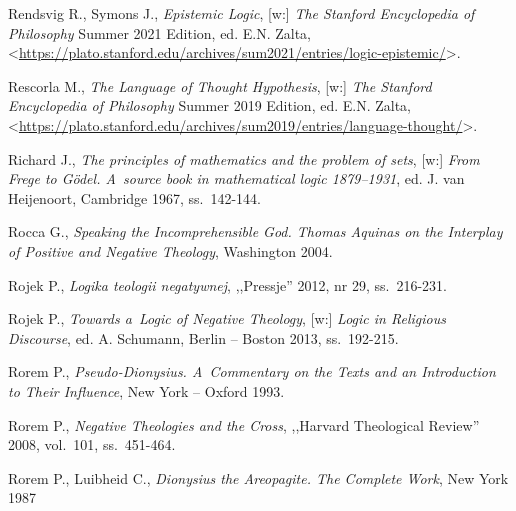 \begin{thebibliography}{100}



Rendsvig R., Symons J., \textit{Epistemic Logic}, [w:] \textit{The Stanford Encyclopedia of Philosophy}
Summer 2021 Edition, ed. E.N. Zalta, <\url{https://plato.stanford.edu/archives/sum2021/entries/logic-epistemic/}>.

Rescorla M., \textit{The Language of Thought Hypothesis}, [w:] \textit{The Stanford Encyclopedia of Philosophy}
Summer 2019 Edition, ed. E.N. Zalta, <\url{https://plato.stanford.edu/archives/sum2019/entries/language-thought/}>.

Richard J., \textit{The principles of mathematics and the problem of sets},
[w:] \textit{From Frege to Gödel. A~source book in mathematical logic 1879–1931}, ed. J. van Heijenoort, Cambridge 1967, ss.~142-144.

Rocca G., \textit{Speaking the Incomprehensible God. Thomas Aquinas on the Interplay of Positive and Negative Theology}, Washington 2004.

Rojek P., \textit{Logika teologii negatywnej}, ,,Pressje'' 2012, nr 29, ss.~216-231.


Rojek P., \textit{Towards a~Logic of Negative Theology}, [w:] \textit{Logic in Religious Discourse}, ed. A. Schumann, Berlin -- Boston 2013, ss.~192-215.

Rorem P., \textit{Pseudo-Dionysius. A~Commentary on the Texts and an Introduction to Their Influence}, New York -- Oxford 1993.

Rorem P., \textit{Negative Theologies and the Cross}, ,,Harvard Theological Review'' 2008, vol.~101, ss.~451-464.

Rorem P., Luibheid C., \textit{Dionysius the Areopagite. The Complete Work}, New York 1987



\end{thebibliography}
